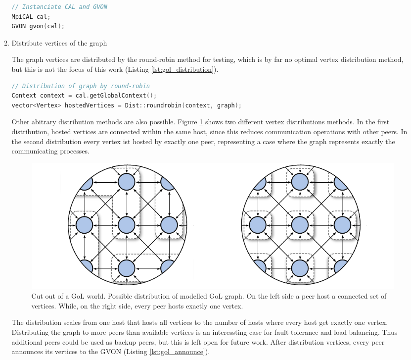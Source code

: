 \begin{enumerate}
\begin{enumerate}
  \begin{lstlisting}[language=C++, label=lst:, caption={\ }]
// Instanciate CAL and GVON
MpiCAL cal;
GVON gvon(cal);
  \end{lstlisting}

\item Distribute vertices of the graph

  The graph vertices are distributed by the round-robin method for
  testing, which is by far no optimal vertex distribution method, but
  this is not the focus of this work (Listing \ref{lst:gol_distribution}).  

  \begin{lstlisting}[language=C++, label=lst:gol_distribution, caption={\ }]
// Distribution of graph by round-robin
Context context = cal.getGlobalContext();
vector<Vertex> hostedVertices = Dist::roundrobin(context, graph);
  \end{lstlisting}

  Other abitrary distribution methods are also possible. Figure
  \ref{fig:gol_mapping} shows two different vertex distributions
  methods.  In the first distribution, hosted vertices are connected
  within the same host, since this reduces communication operations
  with other peers.  In the second distribution every vertex ist
  hosted by exactly one peer, representing a case where the graph
  represents exactly the communicating processes.

  \begin{figure}[H]
    \centering
    \includegraphics[width=\textwidth]{graphics/40_gol_mapping}
    \caption{Cut out of a GoL world. Possible distribution of modelled
      GoL graph. On the left side a peer host a connected set of
      vertices. While, on the right side, every peer hosts exactly one
      vertex.}
    \label{fig:gol_mapping}
  \end{figure}

  The distribution scales from one host that hosts all vertices to the
  number of hosts where every host get exactly one
  vertex. Distributing the graph to more peers than available vertices
  is an interessting case for fault tolerance and load balancing. Thus
  additional peers could be used as backup peers, but this is left
  open for future work.  After distribution vertices, every peer
  announces its vertices to the GVON (Listing \ref{lst:gol_announce}).


\end{enumerate}
\end{enumerate}
